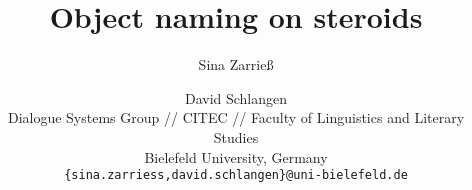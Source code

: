 \documentclass[11pt]{article}
\title{Object naming on steroids}
\author{Sina Zarrie{\ss}  \and David Schlangen\\
  Dialogue Systems Group // CITEC // Faculty of Linguistics and Literary Studies \\
 Bielefeld University, Germany \\
  {\tt \{sina.zarriess,david.schlangen\}@uni-bielefeld.de} \\}
\date{}
\begin{document}
\maketitle

\begin{abstract}
\end{abstract}





%




\end{document}
